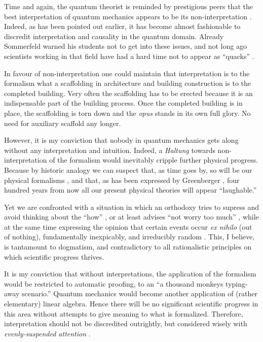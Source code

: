 \documentclass[%
 preprint,
 showpacs,
 showkeys,
 preprintnumbers,
 amsmath,amssymb,
 aps,
  pra,
  longbibliography,
 ]{revtex4-1}
\begin{document}
Time and again, the quantum theorist is reminded by prestigious peers that the best
interpretation of quantum mechanics appears to be its non-interpretation \cite{Fuchs-Peres}.
Indeed, as has been pointed out earlier, it has become almost fashionable to discredit interpretation
and causality in the quantum domain.
Already Sommerfeld warned his students not to get
into these issues,
and not long ago scientists working in that field
have had a hard time not to appear as ``quacks'' \cite{clauser-talkvie}.

In favour of non-interpretation one could maintain that
interpretation is to the formalism what a
scaffolding in architecture and
building construction is to the completed building.
Very often the scaffolding has to be erected because
it is an indispensable part of the building process.
Once the completed building is in place, the scaffolding is torn down and
the {\em opus} stands in its own full glory.
No need for auxiliary scaffold any longer.

However, it is my conviction
that nobody in quantum mechanics gets along without any interpretation
and intuition.
Indeed, a {\it Haltung} towards non-interpretation of the formalism would inevitably cripple further physical progress.
Because by historic analogy we can suspect that, as time goes by, so will be our physical formalisms \cite{lakatosch},
and that, as has been expressed by Greenberger \cite{greenberger-talk-99}, four hundred years from now
all our present physical theories will appear ``laughable.''

Yet we are confronted with a situation in which an orthodoxy tries to supress and avoid thinking about the ``how'' \cite[p.~129]{feynman-law},
or at least advises ``not worry too much''  \cite{dirac-noworries},
while at the same time expressing the opinion that certain events occur {\it ex nihilo} (out of nothing), fundamentally
inexpicably, and irreducibly random \cite{zeil-05_nature_ofQuantum}.
This, I believe, is tantamount to dogmatism,
and contradictory to all rationalistic principles on which scientific progress thrives.

It is my conviction that
without interpretations, the application of the formalism would be restricted to
automatic proofing, to an ``a thousand monkeys typing-away scenario.''
Quantum mechanics would become another application of (rather elementary) linear algebra.
Hence   there will be no significant scientific progress in this area without
attempts to give meaning to what is formalized.
Therefore, interpretation should not be discredited outrightly,
but considered wisely with {\em evenly-suspended attention}
\cite{Freud-1912}.
\end{document}
